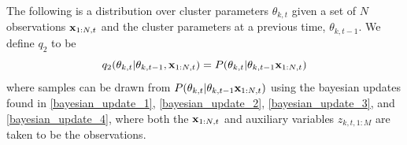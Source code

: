 \documentclass[twocolumn, final]{svjour3}
\begin{document}
The following is a distribution over cluster parameters $\theta_{k,t}$ given a set of $N$ observations $\bold{x}_{1:N, t}$ and the cluster parameters at a previous time, $\theta_{k,t-1}$. We define $q_{2}$ to be
\begin{equation}
\label{smc_q2_eqn}
q_{2}(\theta_{k,t} | \theta_{k,t-1},\bold{x}_{1:N,t}) = P(\theta_{k,t} | \theta_{k,t-1} \bold{x}_{1:N,t})
\end{equation}
where samples can be drawn from $P(\theta_{k,t} | \theta_{k,t-1} \bold{x}_{1:N,t})$ using the bayesian updates found in \eqref{bayesian_update_1}, \eqref{bayesian_update_2}, \eqref{bayesian_update_3}, and \eqref{bayesian_update_4}, where both the $\bold{x}_{1:N,t}$ and auxiliary variables $z_{k,t,1:M}$ are taken to be the observations.


\end{document}
